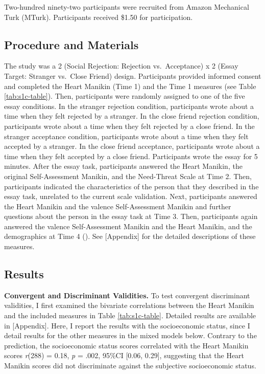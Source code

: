 \documentclass[
]{udthesis}
\begin{document}
Two-hundred ninety-two participants were recruited from Amazon
Mechanical Turk (MTurk). Participants received \$1.50 for participation.

\subsection{Procedure and Materials}\label{procedure-and-materials-2}

The study was a 2 (Social Rejection: Rejection vs.~Acceptance) x 2
(Essay Target: Stranger vs.~Close Friend) design. Participants provided
informed consent and completed the Heart Manikin (Time 1) and the Time 1
measures (see Table \ref{tab:s1c-table}). Then, participants were
randomly assigned to one of the five essay conditions. In the stranger
rejection condition, participants wrote about a time when they felt
rejected by a stranger. In the close friend rejection condition,
participants wrote about a time when they felt rejected by a close
friend. In the stranger acceptance condition, participants wrote about a
time when they felt accepted by a stranger. In the close friend
acceptance, participants wrote about a time when they felt accepted by a
close friend. Participants wrote the essay for 5 minutes. After the
essay task, participants answered the Heart Manikin, the original
Self-Assessment Manikin, and the Need-Threat Scale at Time 2. Then,
participants indicated the characteristics of the person that they
described in the essay task, unrelated to the current scale validation.
Next, participants answered the Heart Manikin and the valence
Self-Assessment Manikin and further questions about the person in the
essay task at Time 3. Then, participants again answered the valence
Self-Assessment Manikin and the Heart Manikin, and the demographics at
Time 4 (). See {[}Appendix{]} for the detailed
descriptions of these measures.

\subsection{Results}\label{results-2}

\textbf{Convergent and Discriminant Validities.} To test convergent
discriminant validities, I first examined the bivariate correlations
between the Heart Manikin and the included measures in Table
\ref{tab:s1c-table}. Detailed results are available in {[}Appendix{]}.
Here, I report the results with the socioeconomic status, since I detail
results for the other measures in the mixed models below. Contrary to
the prediction, the socioeconomic status scores correlated with the
Heart Manikin scores \emph{r}(288) = 0.18, \emph{p} = .002, 95\%CI {[}0.06, 0.29{]}, suggesting
that the Heart Manikin scores did not discriminate against the subjective
socioeconomic status.
\end{document}
